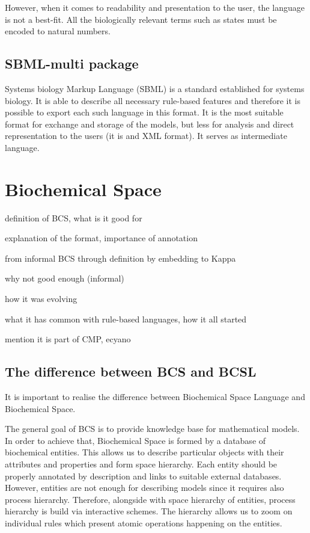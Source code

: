 \documentclass[12pt]{fithesis2}
\begin{document}
However, when it comes to readability and presentation to the user, the language is not a best-fit. All the biologically relevant terms such as states must be encoded to natural numbers.

\subsection{SBML-multi package}

Systems biology Markup Language (SBML) is a standard established for systems biology. It is able to describe all necessary rule-based features and therefore it is possible to export each such language in this format. It is the most suitable format for exchange and storage of the models, but less for analysis and direct representation to the users (it is and XML format). It serves as intermediate language. 

\section{Biochemical Space}

definition of BCS, what is it good for

explanation of the format, importance of annotation

from informal BCS through definition by embedding to Kappa

why not good enough (informal)

how it was evolving

what it has common with rule-based languages, how it all started

mention it is part of CMP, ecyano

\subsection{The difference between BCS and BCSL}

It is important to realise the difference between Biochemical Space Language and Biochemical Space. 

The general goal of BCS is to provide knowledge base for mathematical models. In order to achieve that, Biochemical Space is formed by a database of biochemical entities. This allows us to describe particular objects with their attributes and properties and form space hierarchy. Each entity should be properly annotated by description and links to suitable external databases. However, entities are not enough for describing models since it requires also process hierarchy. Therefore, alongside with space hierarchy of entities, process hierarchy is build via interactive schemes. The hierarchy allows us to zoom on individual rules which present atomic operations happening on the entities.
\end{document}
